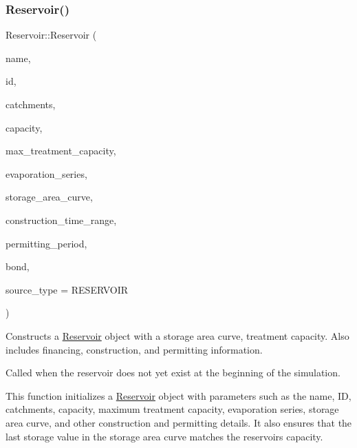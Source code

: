 \subsubsection{\texorpdfstring{Reservoir()}{Reservoir()}\hspace{0.1cm}{\footnotesize\ttfamily [2/9]}}
{\footnotesize\ttfamily Reservoir\+::\+Reservoir (\begin{DoxyParamCaption}\item[{const char $\ast$}]{name,  }\item[{const int}]{id,  }\item[{const vector$<$ \mbox{\hyperlink{classCatchment}{Catchment}} $\ast$$>$ \&}]{catchments,  }\item[{const double}]{capacity,  }\item[{const double}]{max\+\_\+treatment\+\_\+capacity,  }\item[{\mbox{\hyperlink{classEvaporationSeries}{Evaporation\+Series}} \&}]{evaporation\+\_\+series,  }\item[{\mbox{\hyperlink{classDataSeries}{Data\+Series}} $\ast$}]{storage\+\_\+area\+\_\+curve,  }\item[{const vector$<$ double $>$ \&}]{construction\+\_\+time\+\_\+range,  }\item[{double}]{permitting\+\_\+period,  }\item[{\mbox{\hyperlink{classBond}{Bond}} \&}]{bond,  }\item[{int}]{source\+\_\+type = {\ttfamily RESERVOIR} }\end{DoxyParamCaption})}



Constructs a \mbox{\hyperlink{classReservoir}{Reservoir}} object with a storage area curve, treatment capacity. Also includes financing, construction, and permitting information. 

Called when the reservoir does not yet exist at the beginning of the simulation.

This function initializes a \mbox{\hyperlink{classReservoir}{Reservoir}} object with parameters such as the name, ID, catchments, capacity, maximum treatment capacity, evaporation series, storage area curve, and other construction and permitting details. It also ensures that the last storage value in the storage area curve matches the reservoir\textquotesingle{}s capacity.


